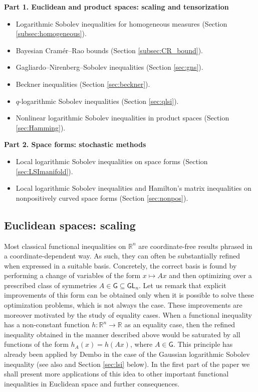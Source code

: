 \documentclass[a4paper,twoside,11pt,reqno]{amsart}
\newcommand{\R}{\mathbb{R}} %
\newcommand{\msf}{\mathsf}
\begin{document}
\medskip

{\bf Part 1. Euclidean and product spaces: scaling and tensorization}
\begin{itemize}
\item Logarithmic Sobolev inequalities for homogeneous measures (Section \ref{subsec:homogeneous}).
\item  Bayesian Cram\'er--Rao bounds (Section \ref{subsec:CR_bound}).
\item Gagliardo–Nirenberg–Sobolev inequalities (Section \ref{sec:gns}).
\item Beckner inequalities (Section \ref{sec:beckner}).
\item $q$-logarithmic Sobolev inequalities (Section \ref{sec:qlsi}).
\item Nonlinear logarithmic Sobolev inequalities in product spaces (Section \ref{sec:Hamming}).
\end{itemize}

{\bf Part 2. Space forms: stochastic methods}
\begin{itemize}
\item Local logarithmic Sobolev inequalities on space forms (Section \ref{sec:LSImanifold}).
\item Local logarithmic Sobolev inequalities and Hamilton's matrix inequalities on nonpositively curved space forms (Section \ref{sec:nonpos}).
\end{itemize}


\subsection{Euclidean spaces: scaling} \label{subsec:scaling}
Most classical functional inequalities on $\R^n$ are coordinate-free results phrased in a coordinate-dependent way. As such, they can often be substantially refined when expressed in a suitable basis. Concretely, the correct basis is found by performing a change of variables of the form $x\mapsto Ax$ and then optimizing over a prescribed class of symmetries $A\in\msf{G}\subseteq \msf{GL}_n$.  Let us remark that explicit improvements of this form can be obtained only when it is possible to solve these optimization problems, which is not always the case. These improvements are moreover motivated by the study of equality cases. When a functional inequality has a non-constant function $h:\R^n\to\R$ as an equality case, then the refined inequality obtained in the manner described above would be saturated by all functions of the form $h_A(x) = h(Ax)$, where $A\in\msf{G}$. This principle has already been applied by Dembo \cite{Dem90} in the case of the Gaussian logarithmic Sobolev inequality (see also \cite{ELS20,BNT22} and Section \ref{sec:lsi} below). In the first part of the paper we shall present more applications of this idea to other important functional inequalities in Euclidean space and further consequences.
\end{document}
